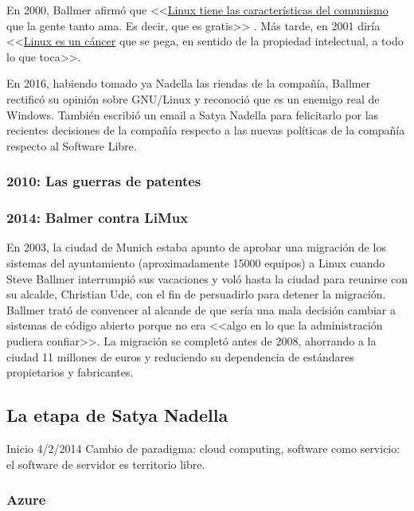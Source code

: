 En 2000, Ballmer afirmó que <<\href{https://www.theregister.co.uk/2000/07/31/ms_ballmer_linux_is_communism/}{Linux tiene las características del comunismo} que la gente tanto ama. Es decir, que es gratis>> \cite{lea_2000:ballmer_linux_comunism}. Más tarde, en 2001 diría <<\href{https://www.theregister.co.uk/2001/06/02/ballmer_linux_is_a_cancer/}{Linux es un cáncer} que se pega, en sentido de la propiedad intelectual, a todo lo que toca>>. \cite{greene_2018:ballmer_linux_cancer}

En 2016, habiendo tomado ya Nadella las riendas de la compañía, Ballmer rectificó su opinión sobre GNU/Linux y reconoció que es un enemigo real de Windows. También escribió un email a Satya Nadella para felicitarlo por las recientes decisiones de la compañía respecto a las nuevas políticas de la compañía respecto al Software Libre.\cite{tung_2016:ballmer_linux_no_more_cancer}

\subsubsection{2010: Las guerras de patentes}


\subsubsection{2014: Balmer contra LiMux}
En 2003, la ciudad de Munich estaba apunto de aprobar una migración de los sistemas del ayuntamiento (aproximadamente 15000 equipos) a Linux cuando Steve Ballmer interrumpió sus vacaciones y voló hasta la ciudad para reunirse con su alcalde, Christian Ude, con el fin de persuadirlo para detener la migración. Ballmer trató de convencer al alcande de que sería una mala decisión cambiar a sistemas de código abierto porque no era <<algo en lo que la administración pudiera confiar>>. La migración se completó antes de 2008, ahorrando a la ciudad 11 millones de euros y reduciendo su dependencia de estándares propietarios y fabricantes.\cite{munich_linux_migration}

\subsection{La etapa de Satya Nadella}
Inicio 4/2/2014
Cambio de paradigma: cloud computing, software como servicio: el software de servidor es territorio libre.

\subsubsection{Azure}

